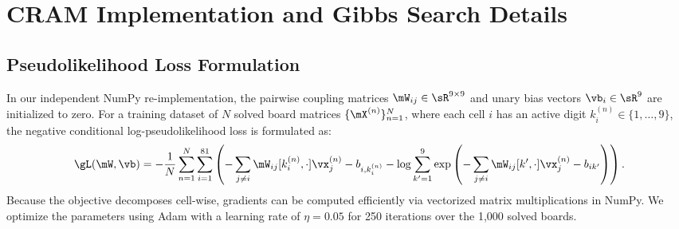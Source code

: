 \documentclass{article} %
\begin{document}
\section{CRAM Implementation and Gibbs Search Details}
\label{sec:appendix_cram}

\subsection{Pseudolikelihood Loss Formulation}
In our independent NumPy re-implementation, the pairwise coupling matrices $\mW_{ij} \in \sR^{9 \times 9}$ and unary bias vectors $\vb_i \in \sR^9$ are initialized to zero. For a training dataset of $N$ solved board matrices $\{\mX^{(n)}\}_{n=1}^N$, where each cell $i$ has an active digit $k_i^{(n)} \in \{1, \dots, 9\}$, the negative conditional log-pseudolikelihood loss is formulated as:
\begin{equation}
\label{eq:appendix_loss}
\gL(\mW, \vb) = -\frac{1}{N} \sum_{n=1}^N \sum_{i=1}^{81} \left( - \sum_{j \neq i} \mW_{ij}[k_i^{(n)}, \cdot] \vx_j^{(n)} - b_{i, k_i^{(n)}} - \log \sum_{k'=1}^9 \exp\left( - \sum_{j \neq i} \mW_{ij}[k', \cdot] \vx_j^{(n)} - b_{ik'} \right) \right).
\end{equation}
Because the objective decomposes cell-wise, gradients can be computed efficiently via vectorized matrix multiplications in NumPy. We optimize the parameters using Adam with a learning rate of $\eta = 0.05$ for 250 iterations over the 1,000 solved boards.
\end{document}
